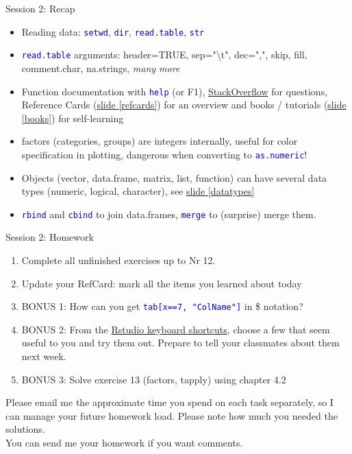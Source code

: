 \documentclass[xcolor=table,       handout,    xcolor=dvipsnames]{beamer}\usepackage[]{graphicx}\usepackage[]{color}
\newcommand{\rcode}[1]{\texttt{\textcolor{Blue}{#1}}} %
\begin{document}
\begin{frame}[fragile]{Session 2: Recap}
\begin{itemize}[<+->]
\item Reading data: \rcode{setwd}, \rcode{dir}, \rcode{read.table}, \rcode{str}
\item \rcode{read.table} arguments: header=TRUE, sep="\textbackslash t", dec=",", skip, fill, comment.char, na.strings, \textit{many more}
\item Function documentation with \rcode{help} (or F1), \href{www.StackOverflow.com}{StackOverflow} for questions, Reference Cards (\hyperlink{refcards}{slide \ref{refcards}}) for an overview and books / tutorials (\hyperlink{books}{slide \ref{books}}) for self-learning
\item factors (categories, groups) are integers internally, useful for color specification in plotting, dangerous when converting to \rcode{as.numeric}!
\item Objects (vector, data.frame, matrix, list, function) can have several data types (numeric, logical, character), see \hyperlink{datatypes}{slide \ref{datatypes}}
\item \rcode{rbind} and \rcode{cbind} to join data.frames, \rcode{merge} to (surprise) merge them.
\end{itemize}
\end{frame}


\begin{frame}{Session 2: Homework}
\pause
\begin{enumerate}[<+->]
\item Complete all unfinished exercises up to Nr 12.
\item Update your RefCard: mark all the items you learned about today
\item BONUS 1: How can you get \rcode{tab[x==7, "ColName"]} in \$ notation?
\item BONUS 2: From the \href{https://support.rstudio.com/hc/en-us/articles/200711853-Keyboard-Shortcuts}{Rstudio keyboard shortcuts}, choose a few that seem useful to you and try them out. Prepare to tell your classmates about them next week.
\item BONUS 3: Solve exercise 13 (factors, tapply) using chapter 4.2
\end{enumerate}
\pause
Please email me the approximate time you spend on each task separately, so I can manage your future homework load.
Please note how much you needed the solutions.\\
You can send me your homework if you want comments.
\label{hw2}
\end{frame}
\end{document}
